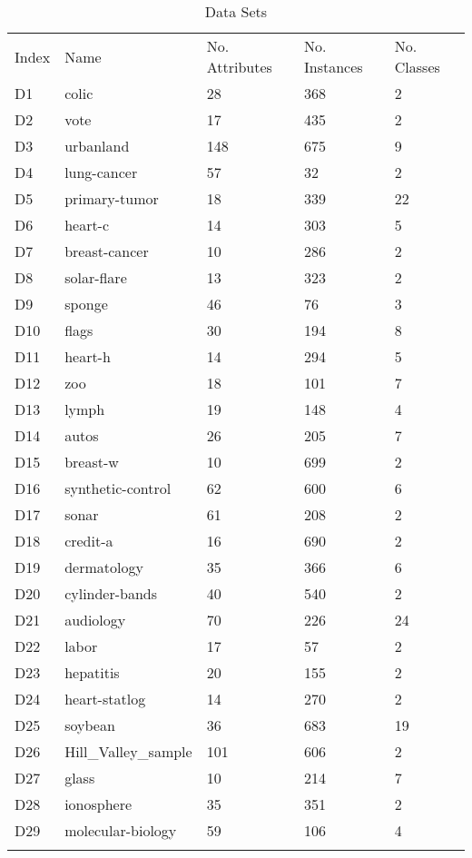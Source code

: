 \begin{table*}[h]
\caption{Data Sets}
\label{tbl:datasets}\begin{tabular}{lllll}
\noalign{\smallskip}\hline\noalign{\smallskip}
Index&Name&No. Attributes&No. Instances&No. Classes\\\noalign{\smallskip}\hline
D1&colic&28&368&2\\
D2&vote&17&435&2\\
D3&urbanland&148&675&9\\
D4&lung-cancer&57&32&2\\
D5&primary-tumor&18&339&22\\
D6&heart-c&14&303&5\\
D7&breast-cancer&10&286&2\\
D8&solar-flare&13&323&2\\
D9&sponge&46&76&3\\
D10&flags&30&194&8\\
D11&heart-h&14&294&5\\
D12&zoo&18&101&7\\
D13&lymph&19&148&4\\
D14&autos&26&205&7\\
D15&breast-w&10&699&2\\
D16&synthetic-control&62&600&6\\
D17&sonar&61&208&2\\
D18&credit-a&16&690&2\\
D19&dermatology&35&366&6\\
D20&cylinder-bands&40&540&2\\
D21&audiology&70&226&24\\
D22&labor&17&57&2\\
D23&hepatitis&20&155&2\\
D24&heart-statlog&14&270&2\\
D25&soybean&36&683&19\\
D26&Hill_Valley_sample&101&606&2\\
D27&glass&10&214&7\\
D28&ionosphere&35&351&2\\
D29&molecular-biology&59&106&4\\
\noalign{\smallskip}\hline
\end{tabular}
\end{table*}